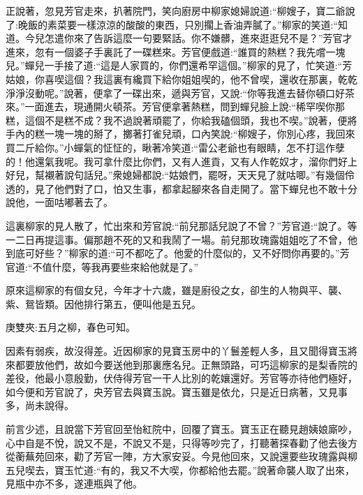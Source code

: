 \begin{parag}
    正說著，忽見芳官走來，扒著院門，笑向廚房中柳家媳婦說道:“柳嫂子，寶二爺說了:晚飯的素菜要一樣涼涼的酸酸的東西，只別擱上香油弄膩了。”柳家的笑道:“知道。今兒怎遣你來了告訴這麼一句要緊話。你不嫌髒，進來逛逛兒不是？”芳官才進來，忽有一個婆子手裏託了一碟糕來。芳官便戲道:“誰買的熱糕？我先嚐一塊兒。”蟬兒一手接了道:“這是人家買的，你們還希罕這個。”柳家的見了，忙笑道:“芳姑娘，你喜喫這個？我這裏有纔買下給你姐姐喫的，他不曾喫，還收在那裏，乾乾淨淨沒動呢。”說著，便拿了一碟出來，遞與芳官，又說:“你等我進去替你頓口好茶來。”一面進去，現通開火頓茶。芳官便拿著熱糕，問到蟬兒臉上說:“稀罕喫你那糕，這個不是糕不成？我不過說著頑罷了，你給我磕個頭，我也不喫。”說著，便將手內的糕一塊一塊的掰了，擲著打雀兒頑，口內笑說:“柳嫂子，你別心疼，我回來買二斤給你。”小蟬氣的怔怔的，瞅著冷笑道:“雷公老爺也有眼睛，怎不打這作孽的！他還氣我呢。我可拿什麼比你們，又有人進貢，又有人作乾奴才，溜你們好上好兒，幫襯著說句話兒。”衆媳婦都說:“姑娘們，罷呀，天天見了就咕唧。”有幾個伶透的，見了他們對了口，怕又生事，都拿起腳來各自走開了。當下蟬兒也不敢十分說他，一面咕嘟著去了。
\end{parag}


\begin{parag}
    這裏柳家的見人散了，忙出來和芳官說:“前兒那話兒說了不曾？”芳官道:“說了。等一二日再提這事。偏那趙不死的又和我鬧了一場。前兒那玫瑰露姐姐吃了不曾，他到底可好些？”柳家的道:“可不都吃了。他愛的什麼似的，又不好問你再要的。”芳官道:“不值什麼，等我再要些來給他就是了。”
\end{parag}


\begin{parag}
    原來這柳家的有個女兒，今年才十六歲，雖是廚役之女，卻生的人物與平、襲、紫、鴛皆類。因他排行第五，便叫他是五兒。\begin{note}庚雙夾:五月之柳，春色可知。\end{note}因素有弱疾，故沒得差。近因柳家的見寶玉房中的丫鬟差輕人多，且又聞得寶玉將來都要放他們，故如今要送他到那裏應名兒。正無頭路，可巧這柳家的是梨香院的差役，他最小意殷勤，伏侍得芳官一干人比別的乾孃還好。芳官等亦待他們極好，如今便和芳官說了，央芳官去與寶玉說。寶玉雖是依允，只是近日病著，又見事多，尚未說得。
\end{parag}


\begin{parag}
    前言少述，且說當下芳官回至怡紅院中，回覆了寶玉。寶玉正在聽見趙姨娘廝吵，心中自是不悅，說又不是，不說又不是，只得等吵完了，打聽著探春勸了他去後方從蘅蕪苑回來，勸了芳官一陣，方大家安妥。今見他回來，又說還要些玫瑰露與柳五兒喫去，寶玉忙道:“有的，我又不大喫，你都給他去罷。”說著命襲人取了出來，見瓶中亦不多，遂連瓶與了他。
\end{parag}


